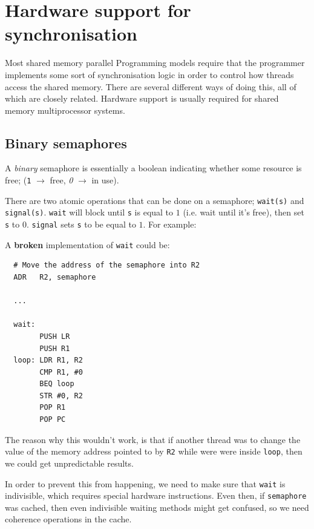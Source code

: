 
\section{Hardware support for synchronisation}

Most shared memory parallel Programming models require that the programmer
implements some sort of synchronisation logic in order to control how threads
access the shared memory. There are several different ways of doing this, all of
which are closely related. Hardware support is usually required for shared
memory multiprocessor systems.

\subsection{Binary semaphores}

A \textit{binary} semaphore is essentially a boolean indicating whether some
resource is free; (\texttt{1} $\rightarrow$ free, \textit{0} $\rightarrow$ in
use).

There are two atomic operations that can be done on a semaphore;
\texttt{wait(s)} and \texttt{signal(s)}. \texttt{wait} will block until
\texttt{s} is equal to $1$ (i.e. wait until it's free), then set \texttt{s} to
$0$. \texttt{signal} sets \texttt{s} to be equal to $1$. For example:


A \textbf{broken} implementation of \texttt{wait} could be:

\begin{verbatim}
  # Move the address of the semaphore into R2
  ADR   R2, semaphore

  ...

  wait:
        PUSH LR
        PUSH R1
  loop: LDR R1, R2
        CMP R1, #0
        BEQ loop
        STR #0, R2
        POP R1
        POP PC
\end{verbatim}

The reason why this wouldn't work, is that if another thread was to change the
value of the memory address pointed to by \texttt{R2} while were were inside
\texttt{loop}, then we could get unpredictable results.

In order to prevent this from happening, we need to make sure that \texttt{wait}
is indivisible, which requires special hardware instructions. Even then, if
\texttt{semaphore} was cached, then even indivisible waiting methods might get
confused, so we need coherence operations in the cache.

